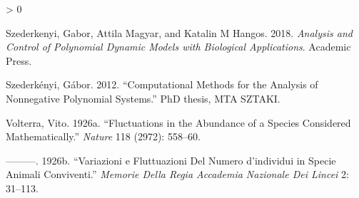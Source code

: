 \documentclass{article}
\newlength{\cslhangindent}
\newenvironment{CSLReferences}[2] %
 {%
  \setlength{\parindent}{0pt}
  \ifodd #1 \everypar{\setlength{\hangindent}{\cslhangindent}}\ignorespaces\fi
  \ifnum #2 > 0
  \setlength{\parskip}{#2\baselineskip}
  \fi
 }%
 {}
\begin{document}
\begin{CSLReferences}{1}{0}
\leavevmode\hypertarget{ref-szederkenyi2018analysis}{}%
Szederkenyi, Gabor, Attila Magyar, and Katalin M Hangos. 2018.
\emph{Analysis and Control of Polynomial Dynamic Models with Biological
Applications}. Academic Press.

\leavevmode\hypertarget{ref-szederkenyi2012computational}{}%
Szederkényi, Gábor. 2012. {``Computational Methods for the Analysis of
Nonnegative Polynomial Systems.''} PhD thesis, MTA SZTAKI.

\leavevmode\hypertarget{ref-volterra1926fluctuations}{}%
Volterra, Vito. 1926a. {``Fluctuations in the Abundance of a Species
Considered Mathematically.''} \emph{Nature} 118 (2972): 558--60.

\leavevmode\hypertarget{ref-volterra1926variazioni}{}%
---------. 1926b. {``Variazioni e Fluttuazioni Del Numero d'individui in
Specie Animali Conviventi.''} \emph{Memorie Della Regia Accademia
Nazionale Dei Lincei} 2: 31--113.

\end{CSLReferences}



\end{document}
